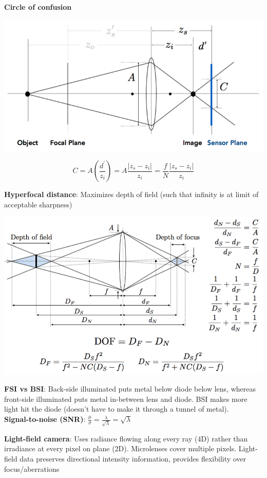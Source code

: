 \documentclass[9pt,landscape]{extarticle}
\begin{document}
\begin{multicols}{3}
\textbf{Circle of confusion}

\includegraphics[scale=0.20]{circle_confusion}

$$
C = A\left(\frac{d^{\prime}}{z_i}\right) = A\frac{|z_s-z_i|}{z_i} = \frac{f}{N}\frac{|z_s-z_i|}{z_i}
$$

\textbf{Hyperfocal distance}: Maximizes depth of field (such that infinity is at limit of acceptable sharpness)

\includegraphics[scale=0.20]{dof}

\textbf{FSI vs BSI}: Back-side illuminated puts metal below diode below lens, whereas front-side illuminated puts metal in-between lens and diode. BSI makes more light hit the diode (doesn't have to make it through a tunnel of metal). \\
\textbf{Signal-to-noise (SNR)}: $\frac{\mu}{\sigma} = \frac{\lambda}{\sqrt{\lambda}} = \sqrt{\lambda}$

\textbf{Light-field camera}: Uses radiance flowing along every ray (4D) rather than irradiance at every pixel on plane (2D). Microlenses cover multiple pixels. Light-field data preserves directional intensity information, provides flexibility over focus/aberrations


\end{multicols}
\end{document}
